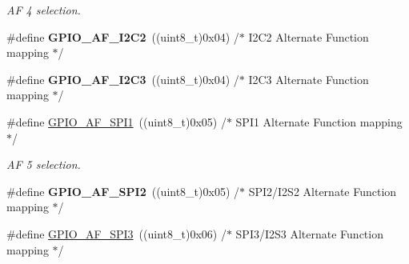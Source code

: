 \begin{DoxyCompactItemize}
\begin{DoxyCompactList}\small\item\em AF 4 selection. \end{DoxyCompactList}\item 
\#define {\bfseries G\+P\+I\+O\+\_\+\+A\+F\+\_\+\+I2\+C2}~((uint8\+\_\+t)0x04)  /$\ast$ I2\+C2 Alternate Function mapping $\ast$/\hypertarget{group___g_p_i_o___alternat__function__selection__define_ga4a82500bac7239134e2c28d4656810f1}{}\label{group___g_p_i_o___alternat__function__selection__define_ga4a82500bac7239134e2c28d4656810f1}

\item 
\#define {\bfseries G\+P\+I\+O\+\_\+\+A\+F\+\_\+\+I2\+C3}~((uint8\+\_\+t)0x04)  /$\ast$ I2\+C3 Alternate Function mapping $\ast$/\hypertarget{group___g_p_i_o___alternat__function__selection__define_ga302620e38b718a54d760845de2a06b2b}{}\label{group___g_p_i_o___alternat__function__selection__define_ga302620e38b718a54d760845de2a06b2b}

\item 
\#define \hyperlink{group___g_p_i_o___alternat__function__selection__define_ga7804aaf9275dbb5502312729a76d13be}{G\+P\+I\+O\+\_\+\+A\+F\+\_\+\+S\+P\+I1}~((uint8\+\_\+t)0x05)  /$\ast$ S\+P\+I1 Alternate Function mapping $\ast$/\hypertarget{group___g_p_i_o___alternat__function__selection__define_ga7804aaf9275dbb5502312729a76d13be}{}\label{group___g_p_i_o___alternat__function__selection__define_ga7804aaf9275dbb5502312729a76d13be}

\begin{DoxyCompactList}\small\item\em AF 5 selection. \end{DoxyCompactList}\item 
\#define {\bfseries G\+P\+I\+O\+\_\+\+A\+F\+\_\+\+S\+P\+I2}~((uint8\+\_\+t)0x05)  /$\ast$ S\+P\+I2/\+I2\+S2 Alternate Function mapping $\ast$/\hypertarget{group___g_p_i_o___alternat__function__selection__define_ga45d0fbf9ba0bf0f554697e78712fc369}{}\label{group___g_p_i_o___alternat__function__selection__define_ga45d0fbf9ba0bf0f554697e78712fc369}

\item 
\#define \hyperlink{group___g_p_i_o___alternat__function__selection__define_gad6e716ad894aa5299273541c6966864a}{G\+P\+I\+O\+\_\+\+A\+F\+\_\+\+S\+P\+I3}~((uint8\+\_\+t)0x06)  /$\ast$ S\+P\+I3/\+I2\+S3 Alternate Function mapping $\ast$/\hypertarget{group___g_p_i_o___alternat__function__selection__define_gad6e716ad894aa5299273541c6966864a}{}\label{group___g_p_i_o___alternat__function__selection__define_gad6e716ad894aa5299273541c6966864a}


\end{DoxyCompactItemize}
